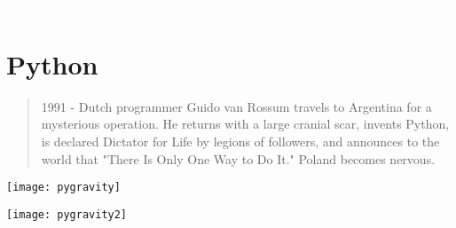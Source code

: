 \documentclass[french]{beamer}
\begin{document}
\begin{frame}
  \textcolor{white}{.}
  \vspace{-2cm}
  \begin{center}
\end{center}
\end{frame}


\section{Python}

\begin{frame}
  \begin{quote}
    1991  -  Dutch programmer  Guido  van  Rossum  travels  to Argentina  for  a
    mysterious operation. He returns with  a large cranial scar, invents Python,
    is declared Dictator for Life by  legions of followers, and announces to the
    world that "There Is Only One Way to Do It." Poland becomes nervous. 
  \end{quote}
\end{frame}



\begin{frame}
  
\begin{center}
  \texttt{[image: pygravity]}
\end{center}
\pause
\begin{center}
  \texttt{[image: pygravity2]}
\end{center}

\end{frame}
\end{document}
